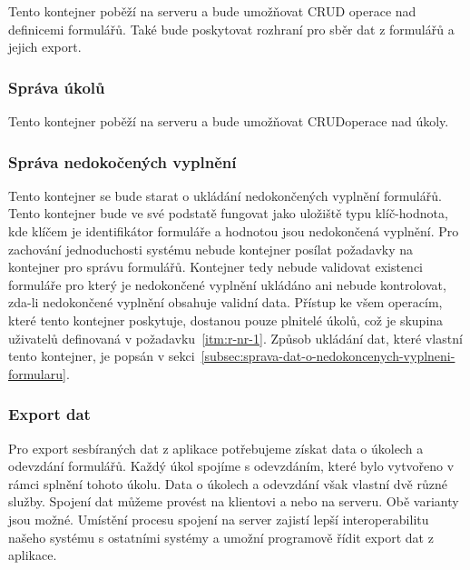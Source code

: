Tento kontejner poběží na serveru a bude umožňovat CRUD\footnotemark{} operace nad definicemi formulářů.
Také bude poskytovat rozhraní pro sběr dat z formulářů a jejich export.

\subsubsection{Správa úkolů}\label{subsubsec:sprava-ukolu}

Tento kontejner poběží na serveru a bude umožňovat CRUD\footnotemark[\value{footnote}] operace nad úkoly.


\subsubsection{Správa nedokočených vyplnění}\label{subsubsec:sprava-nedokoncenych-vyplneni}

Tento kontejner se bude starat o ukládání nedokončených vyplnění formulářů.
Tento kontejner bude ve své podstatě fungovat jako uložiště typu klíč-hodnota, kde klíčem je identifikátor formuláře a hodnotou jsou nedokončená vyplnění.
Pro zachování jednoduchosti systému nebude kontejner posílat požadavky na kontejner pro správu formulářů.
Kontejner tedy nebude validovat existenci formuláře pro který je nedokončené vyplnění ukládáno ani nebude kontrolovat, zda-li nedokončené vyplnění obsahuje validní data.
Přístup ke všem operacím, které tento kontejner poskytuje, dostanou pouze plnitelé úkolů, což je skupina uživatelů definovaná v požadavku~\ref{itm:r-nr-1}.
Způsob ukládání dat, které vlastní tento kontejner, je popsán v sekci~\ref{subsec:sprava-dat-o-nedokoncenych-vyplneni-formularu}.

\subsubsection{Export dat}\label{subsubsec:export-dat}

Pro export sesbíraných dat z aplikace potřebujeme získat data o úkolech a odevzdání formulářů.
Každý úkol spojíme s odevzdáním, které bylo vytvořeno v rámci splnění tohoto úkolu.
Data o úkolech a odevzdání však vlastní dvě různé služby.
Spojení dat můžeme provést na klientovi a nebo na serveru.
Obě varianty jsou možné.
Umístění procesu spojení na server zajistí lepší interoperabilitu našeho systému s ostatními systémy a umožní programově řídit export dat z aplikace.

